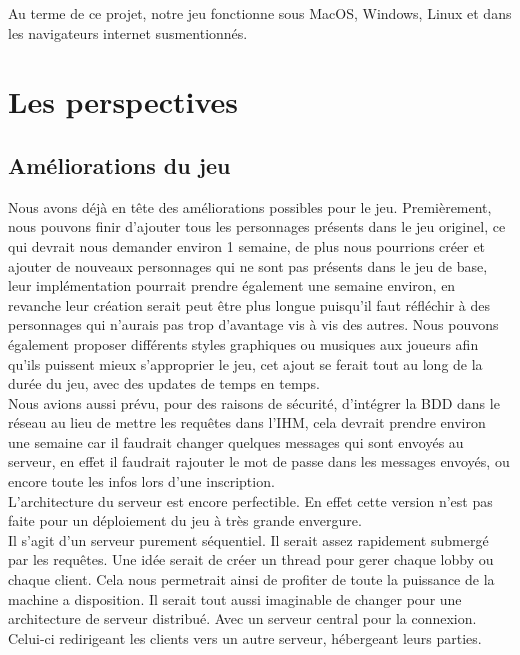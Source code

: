 \documentclass[a4paper,11pt]{article}
\begin{document}
Au terme de ce projet, notre jeu fonctionne sous MacOS, Windows, Linux et dans les navigateurs internet susmentionnés.  \\
 
	
\section{Les perspectives}

\subsection{Améliorations du jeu}

Nous avons déjà en tête des améliorations possibles pour le jeu. Premièrement, nous pouvons finir d’ajouter tous les personnages présents dans le jeu originel, ce qui devrait nous demander environ 1 semaine, de plus nous pourrions créer et ajouter de nouveaux personnages qui ne sont pas présents dans le jeu de base, leur implémentation pourrait prendre également une semaine environ, en revanche leur création serait peut être plus longue puisqu’il faut réfléchir à des personnages qui n’aurais pas trop d’avantage vis à vis des autres. Nous pouvons également proposer différents styles graphiques ou musiques aux joueurs afin qu’ils puissent mieux s’approprier le jeu, cet ajout se ferait tout au long de la durée du jeu, avec des updates de temps en temps. \\

	Nous avions aussi prévu, pour des raisons de sécurité, d'intégrer la BDD dans le réseau au lieu de mettre les requêtes dans l’IHM, cela devrait prendre environ une semaine car il faudrait changer quelques messages qui sont envoyés au serveur, en effet il faudrait rajouter le mot de passe dans les messages envoyés, ou encore toute les infos lors d’une inscription. \\

L’architecture du serveur est encore perfectible. En effet cette version n’est pas faite pour un déploiement du jeu à très grande envergure.  \\
Il s’agit d’un serveur purement séquentiel. Il serait assez rapidement submergé par les requêtes. Une idée serait de créer un thread pour gerer chaque lobby ou chaque client. Cela nous permetrait ainsi de profiter de toute la puissance de la machine a disposition. Il serait tout aussi imaginable de changer pour une architecture de serveur distribué. Avec un serveur central pour la connexion. Celui-ci redirigeant les clients vers un autre serveur, hébergeant leurs parties. \\
\end{document}
